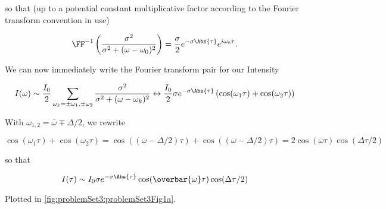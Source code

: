 {so that (up to a potential constant multiplicative factor according to the Fourier transform convention in use)

\begin{dmath}\label{eqn:modernOptics:problemSet3:1:360}
\FF^{-1} 
\left(
\frac{\sigma^2}
{
\sigma^2 + (\omega - \omega_0)^2
}
\right)
= 
\frac{\sigma}{2} e^{-\sigma \Abs{\tau}} e^{i \omega_0 \tau}.
\end{dmath}

We can now immediately write the Fourier transform pair for our Intensity

\begin{dmath}\label{eqn:modernOptics:problemSet3:1:380}
I(\omega) \sim \frac{I_0}{2} \sum_{\omega_k = \pm \omega_1, \pm \omega_2} 
\frac{\sigma^2}{\sigma^2 + (\omega - \omega_k)^2}
\leftrightarrow
\frac{I_0}{2}
\sigma e^{-\sigma \Abs{\tau}} \left(
\cos(\omega_1 \tau)
+\cos(\omega_2 \tau)
\right)
\end{dmath}

With $\omega_{1,2} = \overbar{\omega} \mp \Delta/2$, we rewrite

\begin{dmath}\label{eqn:modernOptics:problemSet3:1:400}
\cos(\omega_1 \tau) +\cos(\omega_2 \tau)
=
\cos\left( 
\left(
\overbar{\omega} - \Delta/2 
\right) \tau 
\right)
+
\cos\left( 
\left(
\overbar{\omega} - \Delta/2 
\right) \tau 
\right)
= 2 \cos( \overbar{\omega} \tau ) \cos ( \Delta \tau/2 )
\end{dmath}

so that

\begin{dmath}\label{eqn:modernOptics:problemSet3:1:420}
I(\tau) \sim
I_0
\sigma e^{-\sigma \Abs{\tau}} 
\cos( \overbar{\omega} \tau ) \cos ( \Delta \tau /2 )
\end{dmath}

Plotted in \cref{fig:problemSet3:problemSet3Fig1a}.


}
